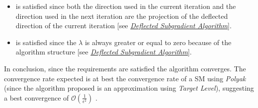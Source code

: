 \documentclass[12pt]{article}
\begin{document}
	\begin{itemize}
	    \item \parencite[see][Cond 2.13]{deflectconv} is satisfied since both the direction used in the current iteration and the direction used in the next iteration are the projection of the deflected direction of the current iteration [see \hyperref[algo:2]{\textit{Deflected Subgradient Algorithm}}].
	    \item \parencite[see][Cond 3.5]{deflectconv} is satisfied since the $\lambda$ is always greater or equal to zero because of the algorithm structure [see \hyperref[algo:2]{\textit{Deflected Subgradient Algorithm}}].
	\end{itemize}
	In conclusion, since the requirements are satisfied the algorithm converges. The convergence rate expected is at best the convergence rate of a SM using \textit{Polyak} (since the algorithm proposed is an approximation using \textit{Target Level}), suggesting a best convergence of $\mathcal{O}(\frac{1}{\epsilon^2})$ \parencite[see][Slide 41]{slidesubgr} .

    
\pagebreak
\printbibliography
    
\end{document}
